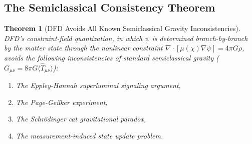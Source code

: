 \documentclass[11pt,a4paper]{article}
\newtheorem{theorem}{Theorem}
\begin{document}
\subsection{The Semiclassical Consistency Theorem}

\begin{theorem}[DFD Avoids All Known Semiclassical Gravity Inconsistencies]
\label{thm:semiclassical}
DFD's constraint-field quantization, in which $\psi$ is determined branch-by-branch by the matter state through the nonlinear constraint $\nabla\cdot[\mu(\chi)\nabla\psi] = 4\pi G\rho$, avoids the following inconsistencies of standard semiclassical gravity ($G_{\mu\nu} = 8\pi G\langle\hat{T}_{\mu\nu}\rangle$):
\begin{enumerate}
\item[(a)] The Eppley-Hannah superluminal signaling argument,
\item[(b)] The Page-Geilker experiment,
\item[(c)] The Schr\"odinger cat gravitational paradox,
\item[(d)] The measurement-induced state update problem.
\end{enumerate}
\end{theorem}
\end{document}
